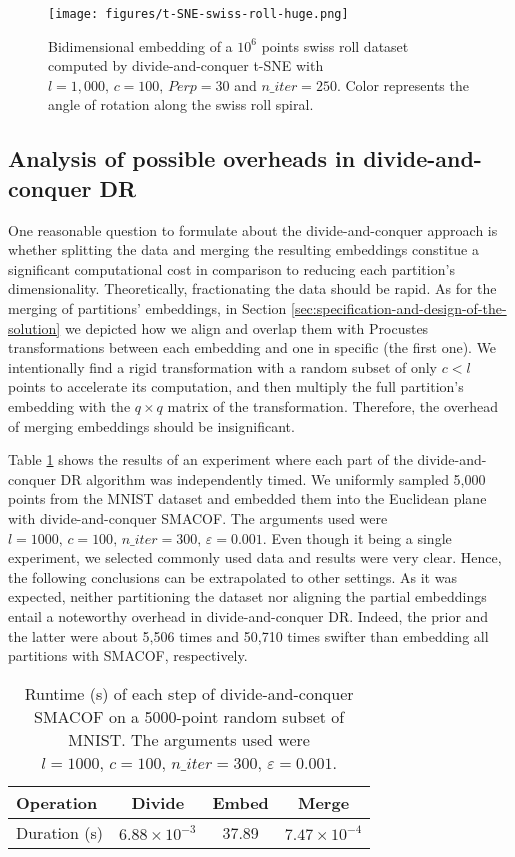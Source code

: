\begin{figure}
    \centering
    \texttt{[image: figures/t-SNE-swiss-roll-huge.png]}
    \caption{Bidimensional embedding of a $10^6$ points swiss roll dataset computed by divide-and-conquer t-SNE with $l=1,000, \, c=100, \, Perp=30$ and $n\_iter=250$. Color represents the angle of rotation along the swiss roll spiral.}
    \label{fig:t-SNE-huge}
\end{figure}

\subsection{Analysis of possible overheads in divide-and-conquer DR}
\label{sec:overheads-DR}

One reasonable question to formulate about the divide-and-conquer approach is whether splitting the data and merging the resulting embeddings constitue a significant computational cost in comparison to reducing each partition's dimensionality. Theoretically, fractionating the data should be rapid. As for the merging of partitions' embeddings, in Section \ref{sec:specification-and-design-of-the-solution} we depicted how we align and overlap them with Procustes transformations between each embedding and one in specific (the first one). We intentionally find a rigid transformation with a random subset of only $c < l$ points to accelerate its computation, and then multiply the full partition's embedding with the $q\times q$ matrix of the transformation. Therefore, the overhead of merging embeddings should be insignificant.

Table \ref{tab:dc-overhead} shows the results of an experiment where each part of the divide-and-conquer DR algorithm was independently timed. We uniformly sampled 5,000 points from the MNIST dataset and embedded them into the Euclidean plane with divide-and-conquer SMACOF. The arguments used were $l=1000,\, c=100,\, n\_iter = 300,\, \varepsilon = 0.001$. Even though it being a single experiment, we selected commonly used data and results were very clear.  Hence, the following conclusions can be extrapolated to other settings. As it was expected, neither partitioning the dataset nor aligning the partial embeddings entail a noteworthy overhead in divide-and-conquer DR. Indeed, the prior and the latter were about 5,506 times and 50,710 times swifter than embedding all partitions with SMACOF, respectively.

\begin{table}
    \centering
    \caption{Runtime (s) of each step of divide-and-conquer SMACOF on a 5000-point random subset of MNIST. The arguments used were $l=1000,\, c=100,\, n\_iter = 300,\, \varepsilon = 0.001$.}
    \begin{tabular}{lccc}
        \toprule
        Operation    & Divide & Embed & Merge \\
        \midrule
        Duration (s) & $6.88 \times 10^{-3}$ & 37.89 & $7.47 \times 10^{-4}$ \\
        \bottomrule
    \end{tabular}
    \label{tab:dc-overhead}
\end{table}

